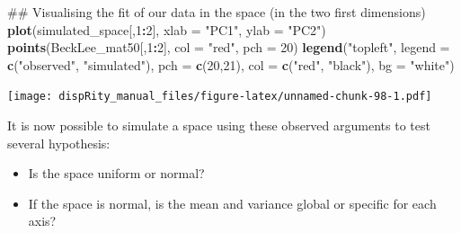 \documentclass[]{book}
\newenvironment{Shaded}{\begin{snugshade}}{\end{snugshade}}
\newcommand{\KeywordTok}[1]{\textcolor[rgb]{0.13,0.29,0.53}{\textbf{#1}}}
\newcommand{\DataTypeTok}[1]{\textcolor[rgb]{0.13,0.29,0.53}{#1}}
\newcommand{\DecValTok}[1]{\textcolor[rgb]{0.00,0.00,0.81}{#1}}
\newcommand{\StringTok}[1]{\textcolor[rgb]{0.31,0.60,0.02}{#1}}
\newcommand{\OperatorTok}[1]{\textcolor[rgb]{0.81,0.36,0.00}{\textbf{#1}}}
\newcommand{\NormalTok}[1]{#1}
\providecommand{\tightlist}{%
  \setlength{\itemsep}{0pt}\setlength{\parskip}{0pt}}
\theoremstyle{definition}
\theoremstyle{definition}
\theoremstyle{definition}
\theoremstyle{remark}
\begin{document}
\begin{Shaded}
\begin{Highlighting}[]
\NormalTok{## Visualising the fit of our data in the space (in the two first dimensions)}
\KeywordTok{plot}\NormalTok{(simulated_space[,}\DecValTok{1}\OperatorTok{:}\DecValTok{2}\NormalTok{], }\DataTypeTok{xlab =} \StringTok{"PC1"}\NormalTok{, }\DataTypeTok{ylab =} \StringTok{"PC2"}\NormalTok{)}
\KeywordTok{points}\NormalTok{(BeckLee_mat50[,}\DecValTok{1}\OperatorTok{:}\DecValTok{2}\NormalTok{], }\DataTypeTok{col =} \StringTok{"red"}\NormalTok{, }\DataTypeTok{pch =} \DecValTok{20}\NormalTok{)}
\KeywordTok{legend}\NormalTok{(}\StringTok{"topleft"}\NormalTok{, }\DataTypeTok{legend =} \KeywordTok{c}\NormalTok{(}\StringTok{"observed"}\NormalTok{, }\StringTok{"simulated"}\NormalTok{),}
        \DataTypeTok{pch =} \KeywordTok{c}\NormalTok{(}\DecValTok{20}\NormalTok{,}\DecValTok{21}\NormalTok{), }\DataTypeTok{col =} \KeywordTok{c}\NormalTok{(}\StringTok{"red"}\NormalTok{, }\StringTok{"black"}\NormalTok{), }\DataTypeTok{bg =} \StringTok{"white"}\NormalTok{)}
\end{Highlighting}
\end{Shaded}

\texttt{[image: dispRity\_manual\_files/figure-latex/unnamed-chunk-98-1.pdf]}

It is now possible to simulate a space using these observed arguments to
test several hypothesis:

\begin{itemize}
\tightlist
\item
  Is the space uniform or normal?
\item
  If the space is normal, is the mean and variance global or specific
  for each axis?
\end{itemize}
\end{document}
